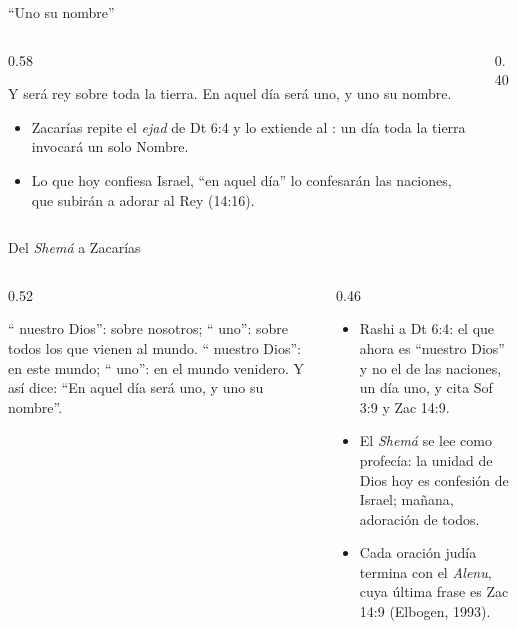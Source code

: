 \begin{frame}{``Uno su nombre''}
\begin{columns}[c,onlytextwidth]
\begin{column}{0.58\textwidth}
\begin{center}\end{center}
\begin{cita}Y \SENOR{} será rey sobre toda la tierra. En aquel día \SENOR{} será uno, y uno su nombre.\end{cita}
\small\RaggedRight
\begin{itemize}
\item Zacarías repite el \emph{ejad} de Dt 6:4 y lo extiende al : un día toda la tierra invocará un solo Nombre.
\item Lo que hoy confiesa Israel, ``en aquel día'' lo confesarán las naciones, que subirán a adorar al Rey (14:16).
\end{itemize}
\end{column}
\begin{column}{0.40\textwidth}\end{column}
\end{columns}
\end{frame}

\begin{frame}{Del \emph{Shemá} a Zacarías}
\begin{columns}[t,onlytextwidth]
\begin{column}{0.52\textwidth}
\begin{cita}[colback=dorado!10!papiro,colframe=dorado!80!azul,fontupper=\scriptsize\itshape]``\SENOR{} nuestro Dios'': sobre nosotros; ``\SENOR{} uno'': sobre todos los que vienen al mundo. ``\SENOR{} nuestro Dios'': en este mundo; ``\SENOR{} uno'': en el mundo venidero. Y así dice: ``En aquel día \SENOR{} será uno, y uno su nombre''.\end{cita}
\begin{center}\scriptsize{}\end{center}
\end{column}
\begin{column}{0.46\textwidth}\small
\begin{itemize}
\item Rashi a Dt 6:4: el que ahora es ``nuestro Dios'' y no el de las naciones,  un día \SENOR{} uno, y cita Sof 3:9 y Zac 14:9.
\item El \emph{Shemá} se lee como profecía: la unidad de Dios hoy es confesión de Israel; mañana, adoración de todos.
\item Cada oración judía termina con el \emph{Alenu}, cuya última frase es Zac 14:9 (Elbogen, 1993).
\end{itemize}
\end{column}
\end{columns}
\end{frame}

